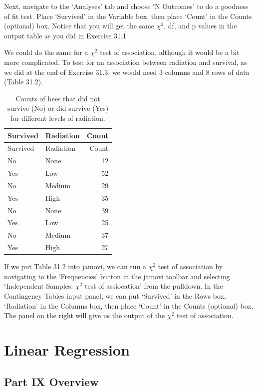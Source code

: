 \documentclass[
]{scrbook}
\begin{document}
Next, navigate to the `Analyses' tab and choose `N Outcomes' to do a goodness of fit test.
Place `Survived' in the Variable box, then place `Count' in the Counts (optional) box.
Notice that you will get the same \(\chi^{2}\), df, and p values in the output table as you did in Exercise 31.1

We could do the same for a \(\chi^{2}\) test of association, although it would be a bit more complicated.
To test for an association between radiation and survival, as we did at the end of Exercise 31.3, we would need 3 columns and 8 rows of data (Table 31.2).

\begin{longtable}[]{@{}llr@{}}
\caption{\label{tab:unnamed-chunk-161}Counts of bees that did not survive (No) or did survive (Yes) for different levels of radiation.}\tabularnewline
\toprule
Survived & Radiation & Count \\
\midrule
\endfirsthead
\toprule
Survived & Radiation & Count \\
\midrule
\endhead
No & None & 12 \\
Yes & Low & 52 \\
No & Medium & 29 \\
Yes & High & 35 \\
No & None & 39 \\
Yes & Low & 25 \\
No & Medium & 37 \\
Yes & High & 27 \\
\bottomrule
\end{longtable}

If we put Table 31.2 into jamovi, we can run a \(\chi^{2}\) test of association by navigating to the `Frequencies' button in the jamovi toolbar and selecting `Independent Samples: \(\chi^{2}\) test of assiocation' from the pulldown.
In the Contingency Tables input panel, we can put `Survived' in the Rows box, `Radiation' in the Columns box, then place `Count' in the Counts (optional) box.
The panel on the right will give us the output of the \(\chi^{2}\) test of association.

\hypertarget{part-linear-regression}{%
\part{Linear Regression}\label{part-linear-regression}}

\hypertarget{Week10}{%
\chapter*{Part IX Overview}\label{Week10}}
\end{document}
